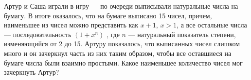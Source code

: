 
Артур и Саша играли в игру — по очереди выписывали натуральные числа на бумагу. 
В итоге оказалось, что на бумаге выписано 15 чисел, причем, наименьшее из чисел можно представить как 
$x+1$, $x > 1$, а все остальные числа — последовательность $(1+x^n)$ , где $n$  — натуральный показатель степени, 
изменяющийся от 2 до 15. Артуру показалось, что выписанных чисел слишком много и он зачеркнул часть 
из них таким образом, чтобы все оставшиеся на бумаге числа были взаимно простыми. 
Какое наименьшее количество чисел мог зачеркнуть Артур?

\soultionSection

